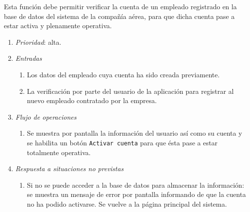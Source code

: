 	Esta función debe permitir verificar la cuenta de un empleado registrado en la base de datos del sistema de la compañía aérea, para que dicha cuenta pase a estar activa y plenamente operativa.

\begin{enumerate}
	\item \textit{Prioridad}: alta.
	\item \textit{Entradas}
	\begin{enumerate}
		\item Los datos del empleado cuya cuenta ha sido creada previamente.
		\item La verificación por parte del usuario de la aplicación para registrar al nuevo empleado contratado por la empresa.
	\end{enumerate}
	\item \textit{Flujo de operaciones}
	\begin{enumerate}
		\item Se muestra por pantalla la información del usuario así como su cuenta y se habilita un botón \verb|Activar cuenta| para que ésta pase a estar totalmente operativa.
	\end{enumerate}
	\item \textit{Respuesta a situaciones no previstas}
	\begin{enumerate}
		\item Si no se puede acceder a la base de datos para almacenar la información: se muestra un mensaje de error por pantalla informando de que la cuenta no ha podido activarse. Se vuelve a la página principal del sistema.
	\end{enumerate}

\end{enumerate}
